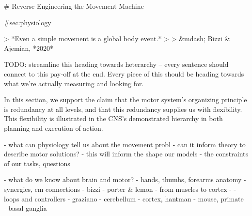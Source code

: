 \documentclass[../main.tex]{subfiles}
\begin{document}









# Reverse Engineering the Movement Machine

{#sec:physiology}

> *Even a simple movement is a global body event.*
>
> &mdash; Bizzi & Ajemian, *2020*

 TODO: streamline this heading towards heterarchy -- every sentence should connect to this pay-off at the end. 
 Every piece of this should be heading towards what we're actually measuring and looking for. 

 In this section, we support the claim that the motor system's organizing principle is redundancy at all levels, and that this redundancy supplies us with flexibility. This flexibility is illustrated in the CNS's demonstrated hierarchy in both planning and execution of action. 

 - what can physiology tell us about the movement probl
  - can it inform theory to describe motor solutions?
  - this will inform the shape our models
  - the constraints of our tasks, questions
  
- what do we know about brain and motor?
  - hands, thumbs, forearms anatomy
  - synergies, cm connections
    - bizzi
    - porter & lemon
    - from muscles to cortex
    - 
- loops and controllers
  - graziano
  - cerebellum
  - cortex, hantman
  - mouse, primate
  - basal ganglia 
\end{document}
